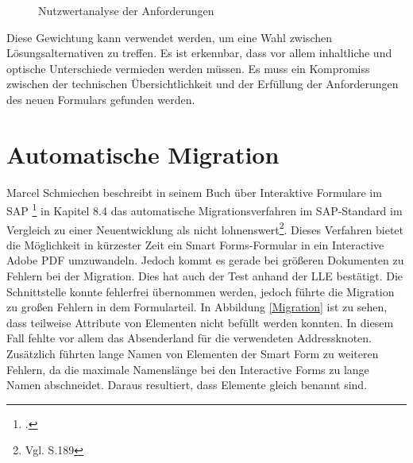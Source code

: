 \begin{figure}[ht]
	\centering
	\caption{Nutzwertanalyse der Anforderungen}
	\label{figNutz}
\end{figure}

Diese Gewichtung kann verwendet werden, um eine Wahl zwischen Lösungsalternativen zu treffen. Es ist erkennbar, dass vor allem inhaltliche und optische Unterschiede vermieden werden müssen. Es muss ein Kompromiss zwischen der technischen Übersichtlichkeit und der Erfüllung der Anforderungen des neuen Formulars gefunden werden.


\section{Automatische Migration}
\label{ch:Migration}

Marcel Schmiechen beschreibt in seinem Buch über Interaktive Formulare im SAP \footcite{Schmiechen.2016} in Kapitel 8.4 das automatische Migrationsverfahren im SAP-Standard im Vergleich zu einer Neuentwicklung als nicht lohnenswert\footnote{Vgl. \cite{Schmiechen.2016} S.189}. Dieses Verfahren bietet die Möglichkeit in kürzester Zeit ein Smart Forms-Formular in ein Interactive Adobe \ac{PDF} umzuwandeln. Jedoch kommt es gerade bei größeren Dokumenten zu Fehlern bei der Migration. Dies hat auch der Test anhand der \ac{LLE} bestätigt. Die Schnittstelle konnte fehlerfrei übernommen werden, jedoch führte die Migration zu großen Fehlern in dem Formularteil. In Abbildung \ref{Migration} ist zu sehen, dass teilweise Attribute von Elementen nicht befüllt werden konnten. In diesem Fall fehlte vor allem das Absenderland für die verwendeten Addressknoten. Zusätzlich führten lange Namen von Elementen der Smart Form zu weiteren Fehlern, da die maximale Namenslänge bei den Interactive Forms zu lange Namen abschneidet. Daraus resultiert, dass Elemente gleich benannt sind.

